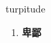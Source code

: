 
\begin{frame}
{\huge turpitude}
\begin{center}
\begin{enumerate}\Large
  \item \textbf{卑鄙}
\end{enumerate}
\end{center}
\end{frame}
